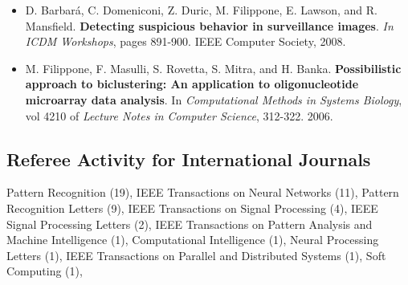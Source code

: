 \documentclass[a4paper,10pt]{article}
\begin{document}
\begin{itemize}
     \item  D. Barbar\'{a}, C. Domeniconi, Z. Duric, M. Filippone, E. Lawson, and R. Mansfield.
       \textbf{Detecting suspicious behavior in surveillance images}.
       \emph{In ICDM Workshops}, pages 891-900. IEEE Computer Society, 2008. 
     \item  M. Filippone, F. Masulli, S. Rovetta, S. Mitra, and H. Banka.
       \textbf{Possibilistic approach to biclustering: An application to oligonucleotide microarray data analysis}.
       In \emph{Computational Methods in Systems Biology}, 
       vol 4210 of \emph{Lecture Notes in Computer Science}, 312-322. 2006.
\end{itemize}


\subsection*{Referee Activity for International Journals}
  Pattern Recognition (19),
  IEEE Transactions on Neural Networks (11), 
  Pattern Recognition Letters (9),
  IEEE Transactions on Signal Processing (4), 
  IEEE Signal Processing Letters (2), 
  IEEE Transactions on Pattern Analysis and Machine Intelligence (1), 
  Computational Intelligence (1),
  Neural Processing Letters (1),
  IEEE Transactions on Parallel and Distributed Systems (1),
  Soft Computing (1),
\end{document}
